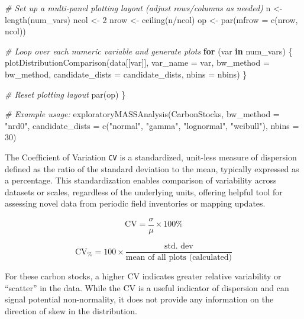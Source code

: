 \documentclass[
]{article}
\newenvironment{Shaded}{}{}
\newcommand{\AttributeTok}[1]{\textcolor[rgb]{0.49,0.56,0.16}{#1}}
\newcommand{\CommentTok}[1]{\textcolor[rgb]{0.38,0.63,0.69}{\textit{#1}}}
\newcommand{\ControlFlowTok}[1]{\textcolor[rgb]{0.00,0.44,0.13}{\textbf{#1}}}
\newcommand{\DecValTok}[1]{\textcolor[rgb]{0.25,0.63,0.44}{#1}}
\newcommand{\FunctionTok}[1]{\textcolor[rgb]{0.02,0.16,0.49}{#1}}
\newcommand{\NormalTok}[1]{#1}
\newcommand{\OtherTok}[1]{\textcolor[rgb]{0.00,0.44,0.13}{#1}}
\newcommand{\SpecialCharTok}[1]{\textcolor[rgb]{0.25,0.44,0.63}{#1}}
\newcommand{\StringTok}[1]{\textcolor[rgb]{0.25,0.44,0.63}{#1}}
\begin{document}
\begin{Shaded}
\begin{Highlighting}[]
    \CommentTok{\# Set up a multi{-}panel plotting layout (adjust rows/columns as needed)}
\NormalTok{    n }\OtherTok{\textless{}{-}} \FunctionTok{length}\NormalTok{(num\_vars)}
\NormalTok{    ncol }\OtherTok{\textless{}{-}} \DecValTok{2}
\NormalTok{    nrow }\OtherTok{\textless{}{-}} \FunctionTok{ceiling}\NormalTok{(n}\SpecialCharTok{/}\NormalTok{ncol)}
\NormalTok{    op }\OtherTok{\textless{}{-}} \FunctionTok{par}\NormalTok{(}\AttributeTok{mfrow =} \FunctionTok{c}\NormalTok{(nrow, ncol))}

    \CommentTok{\# Loop over each numeric variable and generate plots}
    \ControlFlowTok{for}\NormalTok{ (var }\ControlFlowTok{in}\NormalTok{ num\_vars) \{}
        \FunctionTok{plotDistributionComparison}\NormalTok{(data[[var]], }\AttributeTok{var\_name =}\NormalTok{ var, }\AttributeTok{bw\_method =}\NormalTok{ bw\_method,}
            \AttributeTok{candidate\_dists =}\NormalTok{ candidate\_dists, }\AttributeTok{nbins =}\NormalTok{ nbins)}
\NormalTok{    \}}

    \CommentTok{\# Reset plotting layout}
    \FunctionTok{par}\NormalTok{(op)}
\NormalTok{\}}

\CommentTok{\# Example usage:}
\FunctionTok{exploratoryMASSAnalysis}\NormalTok{(CarbonStocks, }\AttributeTok{bw\_method =} \StringTok{"nrd0"}\NormalTok{, }\AttributeTok{candidate\_dists =} \FunctionTok{c}\NormalTok{(}\StringTok{"normal"}\NormalTok{,}
    \StringTok{"gamma"}\NormalTok{, }\StringTok{"lognormal"}\NormalTok{, }\StringTok{"weibull"}\NormalTok{), }\AttributeTok{nbins =} \DecValTok{30}\NormalTok{)}
\end{Highlighting}
\end{Shaded}

The Coefficient of Variation \texttt{CV} is a standardized, unit-less
measure of dispersion defined as the ratio of the standard deviation to
the mean, typically expressed as a percentage. This standardization
enables comparison of variability across datasets or scales, regardless
of the underlying units, offering helpful tool for assessing novel data
from periodic field inventories or mapping updates.

\[
\mathrm{CV} = \frac{\sigma}{\mu} \times 100\%
\]

\[
\mathrm{CV}_{\%} = 100 \times \frac{\text{std. dev}}{\text{mean of all plots (calculated)}}
\]

For these carbon stocks, a higher CV indicates greater relative
variability or ``scatter'' in the data. While the CV is a useful
indicator of dispersion and can signal potential non-normality, it does
not provide any information on the direction of skew in the
distribution.
\end{document}
